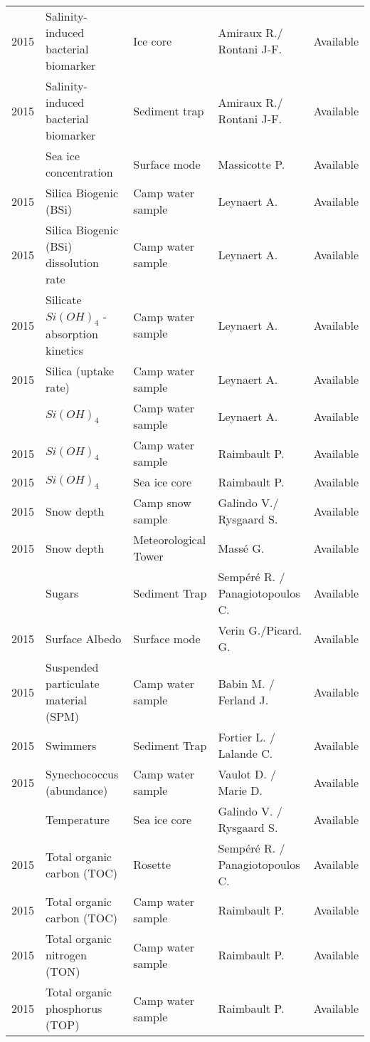 \documentclass[]{article}
\begin{document}
\begin{landscape}
\begin{longtable}[t]{rllll}
2015 & Salinity-induced bacterial biomarker & Ice core & Amiraux R./ Rontani J-F. & Available\\
2015 & Salinity-induced bacterial biomarker & Sediment trap & Amiraux R./ Rontani J-F. & Available\\
\addlinespace
2015 & Sea ice concentration & Surface mode & Massicotte P. & Available\\
2015 & Silica Biogenic (BSi) & Camp water sample & Leynaert A. & Available\\
2015 & Silica Biogenic (BSi) dissolution rate & Camp water sample & Leynaert A. & Available\\
2015 & Silicate $Si(OH)_4$ - absorption kinetics & Camp water sample & Leynaert A. & Available\\
2015 & Silica (uptake rate) & Camp water sample & Leynaert A. & Available\\
\addlinespace
2015 & $Si(OH)_4$ & Camp water sample & Leynaert A. & Available\\
2015 & $Si(OH)_4$ & Camp water sample & Raimbault P. & Available\\
2015 & $Si(OH)_4$ & Sea ice core & Raimbault P. & Available\\
2015 & Snow depth & Camp snow sample & Galindo V./ Rysgaard S. & Available\\
2015 & Snow depth & Meteorological Tower & Massé G. & Available\\
\addlinespace
2015 & Sugars & Sediment Trap & Sempéré R. / Panagiotopoulos C. & Available\\
2015 & Surface Albedo & Surface mode & Verin G./Picard. G. & Available\\
2015 & Suspended particulate material (SPM) & Camp water sample & Babin M. / Ferland J. & Available\\
2015 & Swimmers & Sediment Trap & Fortier L. / Lalande C. & Available\\
2015 & Synechococcus (abundance) & Camp water sample & Vaulot D. / Marie D. & Available\\
\addlinespace
2015 & Temperature & Sea ice core & Galindo V. / Rysgaard S. & Available\\
2015 & Total organic carbon (TOC) & Rosette & Sempéré R. / Panagiotopoulos C. & Available\\
2015 & Total organic carbon (TOC) & Camp water sample & Raimbault P. & Available\\
2015 & Total organic nitrogen (TON) & Camp water sample & Raimbault P. & Available\\
2015 & Total organic phosphorus (TOP) & Camp water sample & Raimbault P. & Available\\

\end{longtable}
\end{landscape}
\end{document}
